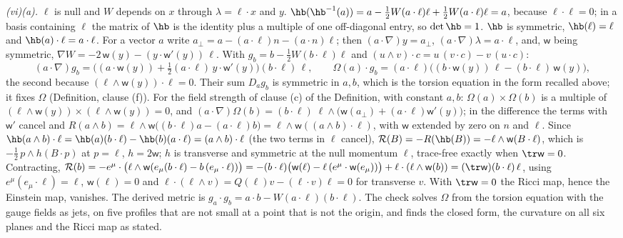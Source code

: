 \emph{(vi)(a).} $\ell$ is null and $W$ depends on $x$ through $\lambda = \ell \cdot x$ and $y$. $\hb(\hb^{-1}(a)) = a - \tfrac12 W(a \cdot \ell)\ell + \tfrac12 W(a \cdot \ell)\ell = a$, because $\ell \cdot \ell = 0$; in a basis containing $\ell$ the matrix of $\hb$ is the identity plus a multiple of one off-diagonal entry, so $\det\hb = 1$. $\hb$ is symmetric, $\hb(\ell) = \ell$ and $\hb(a) \cdot \ell = a \cdot \ell$. For a vector $a$ write $a_{\perp} = a - (a \cdot \ell)n - (a \cdot n)\ell$; then $(a \cdot \nabla)y = a_{\perp}$, $(a \cdot \nabla)\lambda = a \cdot \ell$, and, $\mathsf{w}$ being symmetric, $\nabla W = -2\,\mathsf{w}(y) - (y \cdot \mathsf{w}'(y))\,\ell$. With $g_{b} = b - \tfrac12 W(b \cdot \ell)\ell$ and $(u \wedge v) \cdot c = u\,(v \cdot c) - v\,(u \cdot c)$:
\[
(a \cdot \nabla)g_{b} = \bigl((a \cdot \mathsf{w}(y)) + \tfrac12(a \cdot \ell)\,y \cdot \mathsf{w}'(y)\bigr)(b \cdot \ell)\,\ell, \qquad \Omega(a) \cdot g_{b} = (a \cdot \ell)\bigl((b \cdot \mathsf{w}(y))\,\ell - (b \cdot \ell)\,\mathsf{w}(y)\bigr),
\]
the second because $(\ell \wedge \mathsf{w}(y)) \cdot \ell = 0$. Their sum $D_{a}g_{b}$ is symmetric in $a, b$, which is the torsion equation in the form recalled above; it fixes $\Omega$ (Definition, clause (f)). For the field strength of clause (c) of the Definition, with constant $a, b$: $\Omega(a) \times \Omega(b)$ is a multiple of $(\ell \wedge \mathsf{w}(y)) \times (\ell \wedge \mathsf{w}(y)) = 0$, and $(a \cdot \nabla)\Omega(b) = (b \cdot \ell)\;\ell \wedge \bigl(\mathsf{w}(a_{\perp}) + (a \cdot \ell)\mathsf{w}'(y)\bigr)$; in the difference the terms with $\mathsf{w}'$ cancel and $R(a \wedge b) = \ell \wedge \mathsf{w}\bigl((b \cdot \ell)a - (a \cdot \ell)b\bigr) = \ell \wedge \mathsf{w}((a \wedge b) \cdot \ell)$, with $\mathsf{w}$ extended by zero on $n$ and $\ell$. Since $\hb(a \wedge b) \cdot \ell = \hb(a)(b \cdot \ell) - \hb(b)(a \cdot \ell) = (a \wedge b) \cdot \ell$ (the two terms in $\ell$ cancel), $\mathcal{R}(B) = -R(\hb(B)) = -\ell \wedge \mathsf{w}(B \cdot \ell)$, which is $-\tfrac12\,p \wedge h(B \cdot p)$ at $p = \ell$, $h = 2\mathsf{w}$; $h$ is transverse and symmetric at the null momentum $\ell$, trace-free exactly when $\tr\mathsf{w} = 0$. Contracting, $\mathcal{R}(b) = -e^{\mu} \cdot \bigl(\ell \wedge \mathsf{w}(e_{\mu}(b \cdot \ell) - b\,(e_{\mu} \cdot \ell))\bigr) = -(b \cdot \ell)\bigl(\mathsf{w}(\ell) - \ell\,(e^{\mu} \cdot \mathsf{w}(e_{\mu}))\bigr) + \ell \cdot (\ell \wedge \mathsf{w}(b)) = (\tr\mathsf{w})(b \cdot \ell)\,\ell$, using $e^{\mu}(e_{\mu} \cdot \ell) = \ell$, $\mathsf{w}(\ell) = 0$ and $\ell \cdot (\ell \wedge v) = Q(\ell)v - (\ell \cdot v)\ell = 0$ for transverse $v$. With $\tr\mathsf{w} = 0$ the Ricci map, hence the Einstein map, vanishes. The derived metric is $g_{a} \cdot g_{b} = a \cdot b - W(a \cdot \ell)(b \cdot \ell)$. The check solves $\Omega$ from the torsion equation with the gauge fields as jets, on five profiles that are not small at a point that is not the origin, and finds the closed form, the curvature on all six planes and the Ricci map as stated.


